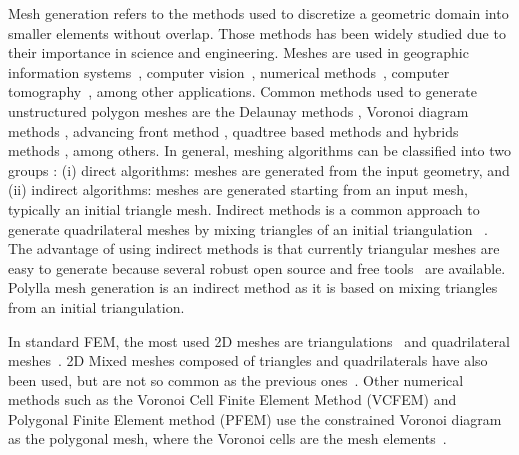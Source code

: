 \documentclass[lineno,pdflatex,sn-mathphys]{sn-jnl}%
\theoremstyle{thmstyleone}%
\theoremstyle{thmstyletwo}%
\theoremstyle{thmstylethree}%
\begin{document}

Mesh generation refers to the methods used to discretize a geometric domain into smaller elements without overlap. Those methods has been widely studied due to their importance in science and engineering. Meshes are used in geographic information systems~\cite{PrinciplesGIS}, computer vision~\cite{JOHNSON1998261},  numerical methods~\cite{HOLE198827}, computer tomography~\cite{Zhang2007Automatic3M}, among other applications. Common methods used to generate unstructured polygon meshes are the Delaunay methods \cite{cheng2013delaunay}, Voronoi diagram methods \cite{yan:hal-00647979, 2dcentroidalvoro, PolyMesher2012}, advancing front method \cite{lohner1996progress, Schberl1997NETGENAA}, quadtree based methods \cite{BERN1994384, bommes2013quad, Liang2013AnOD} and hybrids methods \cite{owen1999q, ito2002unstructured}, among others. In general, meshing algorithms can be classified into two groups \cite{owen1998survey, johnen2016indirect}: (i) direct algorithms:  meshes are generated from the input geometry, and (ii) indirect algorithms: meshes are generated starting from an input mesh, typically an initial triangle mesh. Indirect methods is a common approach to generate quadrilateral meshes by mixing triangles of an initial triangulation ~\cite{LeetreetoQuad, BlossonQuad, Merhof2007Aniso-5662}. The advantage of using indirect methods is that currently triangular meshes are easy to generate because several robust open source and free tools~\cite{triangle2d, Detri2, qhull,  cgal:y-t2-21b} are available. Polylla mesh generation is an indirect method as it is based  on mixing triangles from an initial triangulation. 

In standard FEM, the most used 2D meshes are triangulations~\cite{triangle2d,Detri2, chew1} and quadrilateral meshes~\cite{Canann98, Lee20031055, Owen98advancingfront}. 2D Mixed meshes composed of triangles and quadrilaterals have also been used, but are not so common as the previous ones~\cite{jaillet2021}. Other numerical methods such as  the Voronoi Cell Finite Element Method (VCFEM) \cite{ReviewFEM} and Polygonal Finite Element method (PFEM)\cite{Chi2015PolygonalFE}  use the constrained  Voronoi diagram as the polygonal mesh, where the Voronoi cells are the mesh elements~\cite{YanWLL10,UniformRandomVoronoiMeshes,SiegerAB10}. 
 
\end{document}

